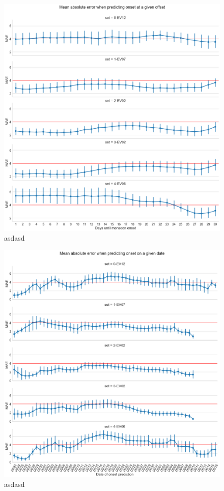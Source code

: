 \begin{figure}[h]
  \centering
  \includegraphics[width=\linewidth]{./99_appendix/img/prediction_accuracy_offset_split.png}
  \caption{asdasd}
  \label{apx:prediction_accuracy_offset_ci}
\end{figure}

\begin{figure}[h]
  \centering
  \includegraphics[width=\linewidth]{./99_appendix/img/prediction_accuracy_dates_split.png}
  \caption{asdasd}
  \label{apx:prediction_accuracy_dates_ci}
\end{figure}
